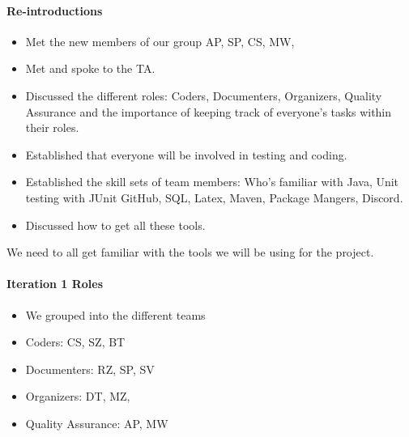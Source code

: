\documentclass[10pt, a4paper]{article}
\begin{document}
			\paragraph{Re-introductions }
			\begin{itemize}
				\item Met the new members of our group AP, SP, CS, MW, 
				\item Met and spoke to the TA. 
				\item	Discussed the different roles: Coders, Documenters, Organizers, Quality Assurance and the importance of keeping track of everyone’s tasks within their roles. 
				\item Established that everyone will be involved in testing and coding. 
				\item Established the skill sets of team members: Who’s familiar with Java, Unit testing with JUnit GitHub, SQL, Latex, Maven, Package Mangers, Discord.
				\item Discussed how to get all these tools.
			\end{itemize}
			We need to all get familiar with the tools we will be using for the project.
			
			\paragraph{Iteration 1 Roles}
			\begin{itemize}
				\item We grouped into the different teams
				\item Coders: CS, SZ, BT
				\item Documenters: RZ, SP, SV
				\item Organizers: DT, MZ, 
				\item Quality Assurance: AP, MW 
			\end{itemize}
			
\end{document}
